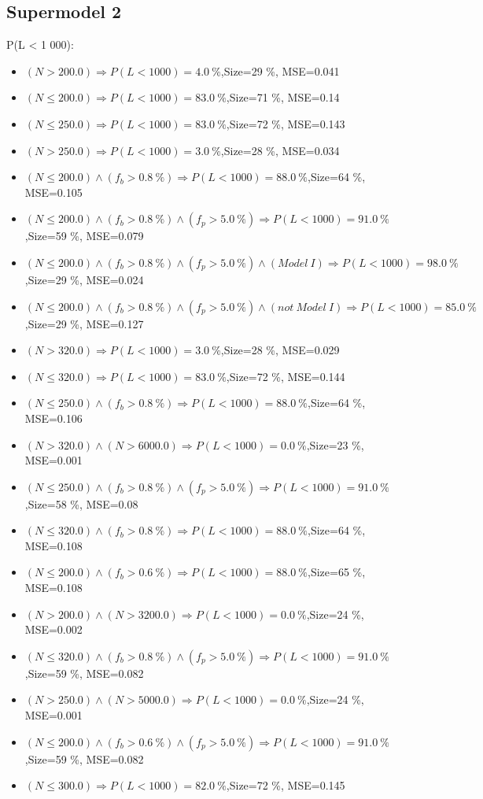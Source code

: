 \documentclass[numbered]{CSL}
\begin{document}
\subsection{Supermodel 2}
P(L < 1 000):
\begin{itemize}
\item $(N > 200.0) \Rightarrow P(L < 1 000) = 4.0~\%$,\hfill Size=29 \%, MSE=0.041
\item $(N \leq 200.0) \Rightarrow P(L < 1 000) = 83.0~\%$,\hfill Size=71 \%, MSE=0.14
\item $(N \leq 250.0) \Rightarrow P(L < 1 000) = 83.0~\%$,\hfill Size=72 \%, MSE=0.143
\item $(N > 250.0) \Rightarrow P(L < 1 000) = 3.0~\%$,\hfill Size=28 \%, MSE=0.034
\item $(N \leq 200.0) \land (f_b > 0.8~\%) \Rightarrow P(L < 1 000) = 88.0~\%$,\hfill Size=64 \%, MSE=0.105
\item $(N \leq 200.0) \land (f_b > 0.8~\%) \land (f_p > 5.0~\%) \Rightarrow P(L < 1 000) = 91.0~\%$,\hfill Size=59 \%, MSE=0.079
\item $(N \leq 200.0) \land (f_b > 0.8~\%) \land (f_p > 5.0~\%) \land (Model~I) \Rightarrow P(L < 1 000) = 98.0~\%$,\hfill Size=29 \%, MSE=0.024
\item $(N \leq 200.0) \land (f_b > 0.8~\%) \land (f_p > 5.0~\%) \land (not~Model~I) \Rightarrow P(L < 1 000) = 85.0~\%$,\hfill Size=29 \%, MSE=0.127
\item $(N > 320.0) \Rightarrow P(L < 1 000) = 3.0~\%$,\hfill Size=28 \%, MSE=0.029
\item $(N \leq 320.0) \Rightarrow P(L < 1 000) = 83.0~\%$,\hfill Size=72 \%, MSE=0.144
\item $(N \leq 250.0) \land (f_b > 0.8~\%) \Rightarrow P(L < 1 000) = 88.0~\%$,\hfill Size=64 \%, MSE=0.106
\item $(N > 320.0) \land (N > 6000.0) \Rightarrow P(L < 1 000) = 0.0~\%$,\hfill Size=23 \%, MSE=0.001
\item $(N \leq 250.0) \land (f_b > 0.8~\%) \land (f_p > 5.0~\%) \Rightarrow P(L < 1 000) = 91.0~\%$,\hfill Size=58 \%, MSE=0.08
\item $(N \leq 320.0) \land (f_b > 0.8~\%) \Rightarrow P(L < 1 000) = 88.0~\%$,\hfill Size=64 \%, MSE=0.108
\item $(N \leq 200.0) \land (f_b > 0.6~\%) \Rightarrow P(L < 1 000) = 88.0~\%$,\hfill Size=65 \%, MSE=0.108
\item $(N > 200.0) \land (N > 3200.0) \Rightarrow P(L < 1 000) = 0.0~\%$,\hfill Size=24 \%, MSE=0.002
\item $(N \leq 320.0) \land (f_b > 0.8~\%) \land (f_p > 5.0~\%) \Rightarrow P(L < 1 000) = 91.0~\%$,\hfill Size=59 \%, MSE=0.082
\item $(N > 250.0) \land (N > 5000.0) \Rightarrow P(L < 1 000) = 0.0~\%$,\hfill Size=24 \%, MSE=0.001
\item $(N \leq 200.0) \land (f_b > 0.6~\%) \land (f_p > 5.0~\%) \Rightarrow P(L < 1 000) = 91.0~\%$,\hfill Size=59 \%, MSE=0.082
\item $(N \leq 300.0) \Rightarrow P(L < 1 000) = 82.0~\%$,\hfill Size=72 \%, MSE=0.145
\end{itemize}
\end{document}
